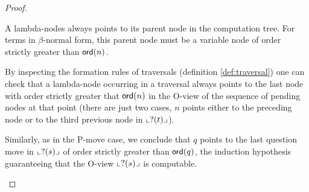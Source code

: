 \begin{proof}
\begin{itemize}
A lambda-nodes always points to its parent node in the computation
tree. For terms in $\beta$-normal form, this parent node must be a
variable node of order strictly greater than ${\sf ord}(n)$.

By inspecting the formation rules of traversals (definition
\ref{def:traversal}) one can check that a lambda-node occurring in a
traversal always points to the last node with order strictly greater
that ${\sf ord}(n)$ in the O-view of the sequence of pending nodes at
that point (there are just two cases, $n$ points either to the
preceding node or to the third previous node in $\llcorner ?(t) \lrcorner$).

Similarly, as in the P-move case, we conclude that $q$ points to the
last question move in $\llcorner ?(s) \lrcorner$ of order strictly greater than
${\sf ord}(q)$, the induction hypothesis guaranteeing that the O-view
$\llcorner ?(s) \lrcorner$ is computable.

\end{itemize}

\end{proof}
